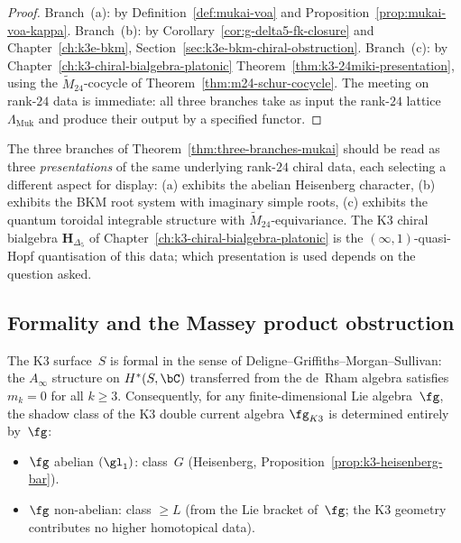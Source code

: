\begin{proof}
Branch~(a): by Definition~\ref{def:mukai-voa} and
Proposition~\ref{prop:mukai-voa-kappa}. Branch~(b): by
Corollary~\ref{cor:g-delta5-fk-closure} and
Chapter~\ref{ch:k3e-bkm}, Section~\ref{sec:k3e-bkm-chiral-obstruction}.
Branch~(c): by Chapter~\ref{ch:k3-chiral-bialgebra-platonic}
Theorem~\ref{thm:k3-24miki-presentation}, using the
$\widetilde{M}_{24}$-cocycle of
Theorem~\ref{thm:m24-schur-cocycle}. The meeting on rank-$24$ data is
immediate: all three branches take as input the rank-$24$ lattice
$\Lambda_{\mathrm{Muk}}$ and produce their output by a specified
functor.
\end{proof}

\begin{remark}
\label{rem:three-presentations-one-data}
The three branches of Theorem~\ref{thm:three-branches-mukai} should be
read as three \emph{presentations} of the same underlying rank-$24$ chiral
data, each selecting a different aspect for display: (a) exhibits the
abelian Heisenberg character, (b) exhibits the BKM root system with
imaginary simple roots, (c) exhibits the quantum toroidal integrable
structure with $\widetilde{M}_{24}$-equivariance. The K3 chiral bialgebra
$\mathbf{H}_{\Delta_5}$ of Chapter~\ref{ch:k3-chiral-bialgebra-platonic}
is the $(\infty,1)$-quasi-Hopf quantisation of this data; which
presentation is used depends on the question asked.
\end{remark}

\subsection{Formality and the Massey product obstruction}
\label{subsec:k3-formality-massey}

\begin{proposition}
\label{prop:k3-formality}
The K3 surface~$S$ is formal in the sense of
Deligne--Griffiths--Morgan--Sullivan: the $A_\infty$ structure on
$H^*(S, \bC)$ transferred from the de~Rham algebra satisfies
$m_k = 0$ for all $k \geq 3$.
Consequently, for any finite-dimensional Lie algebra~$\fg$, the
shadow class of the K3 double current algebra $\fg_{K3}$ is
determined entirely by~$\fg$:
\begin{itemize}
 \item $\fg$ abelian $(\gl_1)$: class~$G$ (Heisenberg,
 Proposition~\textup{\ref{prop:k3-heisenberg-bar}}).
 \item $\fg$ non-abelian: class $\geq L$ (from the Lie bracket
 of~$\fg$; the K3 geometry contributes no higher homotopical data).
\end{itemize}
\end{proposition}


